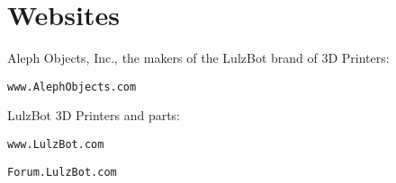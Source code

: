 \section{Websites}

Aleph Objects, Inc., the makers of the LulzBot\textsuperscript{\miniscule{\textregistered}} brand of 3D Printers:

\texttt{www.AlephObjects.com}


LulzBot 3D Printers and parts:

\texttt{www.LulzBot.com}

\texttt{Forum.LulzBot.com}

